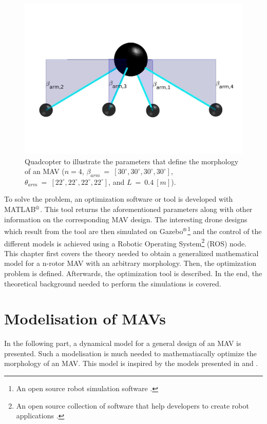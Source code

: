 \begin{figure}[h]
\begin{minipage}[t]{0.3\textwidth}
  \centering
  \includegraphics[width=\textwidth]{images/drone_design2.jpg}
\end{minipage}
\caption{Quadcopter to illustrate the parameters that define the morphology of an
MAV ($n = 4$, $\beta_{arm}\ =\ [30^{\circ}, 30^{\circ}, 30^{\circ}, 30^{\circ}]$,
$\theta_{arm}\ =\ [22^{\circ}, 22^{\circ}, 22^{\circ}, 22^{\circ}]$, and $L\ =\ 0.4\ [m]$).}
\label{fig:drone_design}
\end{figure}

To solve the problem, an optimization software or tool is developed with
MATLAB$^\textrm{\textregistered}$. This tool returns the aforementioned
parameters along with other information on the corresponding MAV design.
The interesting drone designs which result from the tool are then simulated on
Gazebo$^\textrm{\textregistered}$\footnote{An open source robot simulation software \citep{noauthor_gazebo_nodate}.}
and the control of the different models is achieved using a Robotic Operating
System\footnote{An open source collection of software that help developers to
create robot applications \citep{rostutorials}.} (ROS) node.\\
This chapter first covers the theory needed to obtain a generalized mathematical
model for a n-rotor MAV with an arbitrary morphology. Then, the optimization
problem is defined. Afterwards, the optimization tool is described. In the end,
the theoretical background needed to perform the simulations is covered.

\section{Modelisation of MAVs}
\label{sec:modeling_mav}
In the following part, a dynamical model for a general design of an MAV is presented.
Such a modelisation is much needed to mathematiacally optimize the morphology of
an MAV. This model is inspired by the models presented in
\citep{kamel_voliro:_2018} and \citep{ryll_modeling_2012}.

